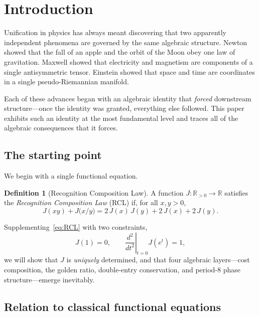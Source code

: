 \documentclass[11pt,a4paper]{article}
\theoremstyle{plain}
\theoremstyle{definition}
\newtheorem{definition}[theorem]{Definition}
\theoremstyle{remark}
\newcommand{\Jcost}{J}
\newcommand{\RR}{\mathbb{R}}
\begin{document}
\section{Introduction}\label{sec:intro}

Unification in physics has always meant discovering that two apparently
independent phenomena are governed by the same algebraic structure.
Newton showed that the fall of an apple and the orbit of the Moon obey
one law of gravitation.  Maxwell showed that electricity and magnetism
are components of a single antisymmetric tensor.  Einstein showed that
space and time are coordinates in a single pseudo-Riemannian manifold.

Each of these advances began with an algebraic identity that
\emph{forced} downstream structure---once the identity was granted,
everything else followed.  This paper exhibits such an identity at the
most fundamental level and traces all of the algebraic consequences
that it forces.

\subsection{The starting point}

We begin with a single functional equation.

\begin{definition}[Recognition Composition Law]\label{def:RCL}
A function $\Jcost:\RR_{>0}\to\RR$ satisfies the \emph{Recognition
Composition Law} (RCL) if, for all $x,y>0$,
\begin{equation}\label{eq:RCL}
  \Jcost(xy)+\Jcost\!\bigl(x/y\bigr)
  =2\,\Jcost(x)\,\Jcost(y)+2\,\Jcost(x)+2\,\Jcost(y).
\end{equation}
\end{definition}

Supplementing~\eqref{eq:RCL} with two constraints,
\begin{equation}\label{eq:norm-calib}
  \Jcost(1)=0,\qquad
  \left.\frac{d^2}{dt^2}\right|_{t=0}\Jcost(e^t)=1,
\end{equation}
we will show that $\Jcost$ is \emph{uniquely} determined, and that
four algebraic layers---cost composition, the golden ratio, double-entry
conservation, and period-8 phase structure---emerge inevitably.

\subsection{Relation to classical functional equations}
\end{document}
